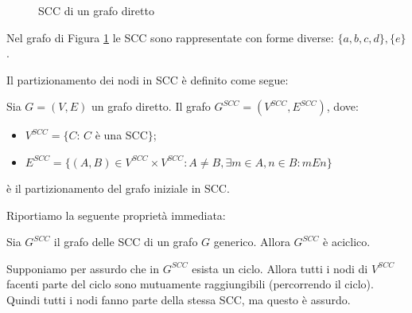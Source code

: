 \begin{example}
    \begin{figure}[t]
        \centering
        \caption{SCC di un grafo diretto}
        \label{fig:graph_cfc_1}
    \end{figure}
    Nel grafo di Figura \ref{fig:graph_cfc_1} le SCC sono rappresentate con forme diverse: $\{a,b,c,d\}, \{e\}$.
\end{example}
Il partizionamento dei nodi in SCC è definito come segue:
\begin{definition}
    Sia $G = (V, E)$ un grafo diretto. Il grafo $G^{SCC} = (V^{SCC}, E^{SCC})$, dove:
    \begin{itemize}
        \item $V^{SCC} = \{C : \,C$ è una SCC$\}$;
        \item $E^{SCC} = \{(A,B) \in V^{SCC} \times V^{SCC} : A \neq B, \exists m \in A, n \in B : m E n\}$
    \end{itemize}
    è il partizionamento del grafo iniziale in SCC.
\end{definition}
Riportiamo la seguente proprietà immediata:
\begin{proposition}
    Sia $G^{SCC}$ il grafo delle SCC di un grafo $G$ generico. Allora $G^{SCC}$ è aciclico.
\end{proposition}
\begin{proof2}
    Supponiamo per assurdo che in $G^{SCC}$ esista un ciclo. Allora tutti i nodi di $V^{SCC}$ facenti parte del ciclo sono mutuamente raggiungibili (percorrendo il ciclo). Quindi tutti i nodi fanno parte della stessa SCC, ma questo è assurdo.
\end{proof2}

